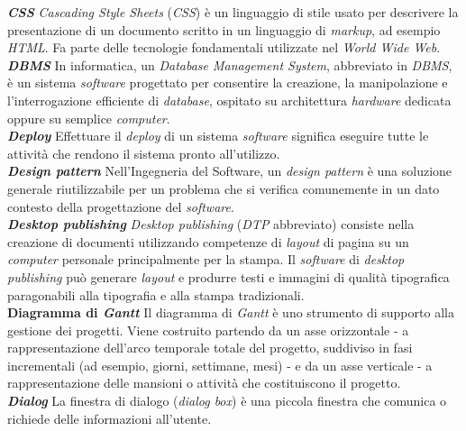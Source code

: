 \textbf{\textit{CSS}} \textit{Cascading Style Sheets} (\textit{CSS}) è un linguaggio di stile usato per descrivere la presentazione di un documento scritto in un linguaggio di \textit{markup}, ad esempio \textit{HTML}. Fa parte delle tecnologie fondamentali utilizzate nel \textit{World Wide Web}.\\

\textbf{\textit{DBMS}} In informatica, un \textit{Database Management System}, abbreviato in \textit{DBMS}, è un sistema \textit{software} progettato per consentire la creazione, la manipolazione e l'interrogazione efficiente di \textit{database}, ospitato su architettura \textit{hardware} dedicata oppure su semplice \textit{computer}.\\

\textbf{\textit{Deploy}} Effettuare il \textit{deploy} di un sistema \textit{software} significa eseguire tutte le attività che rendono il sistema pronto all'utilizzo.\\

\textbf{\textit{Design pattern}} Nell'Ingegneria del Software, un \textit{design pattern} è una soluzione generale riutilizzabile per un problema che si verifica comunemente in un dato contesto della progettazione del \textit{software}.\\

\textbf{\textit{Desktop publishing}} \textit{Desktop publishing} (\textit{DTP} abbreviato) consiste nella creazione di documenti utilizzando competenze di \textit{layout} di pagina su un \textit{computer} personale principalmente per la stampa. Il \textit{software} di \textit{desktop publishing} può generare \textit{layout} e produrre testi e immagini di qualità tipografica paragonabili alla tipografia e alla stampa tradizionali.\\

\textbf{Diagramma di \textit{Gantt}} Il diagramma di \textit{Gantt} è uno strumento di supporto alla gestione dei progetti. Viene costruito partendo da un asse orizzontale - a rappresentazione dell'arco temporale totale del progetto, suddiviso in fasi incrementali (ad esempio, giorni, settimane, mesi) - e da un asse verticale - a rappresentazione delle mansioni o attività che costituiscono il progetto.\\

\textbf{\textit{Dialog}} La finestra di dialogo (\textit{dialog box}) è una piccola finestra che comunica o richiede delle informazioni all'utente.\\

